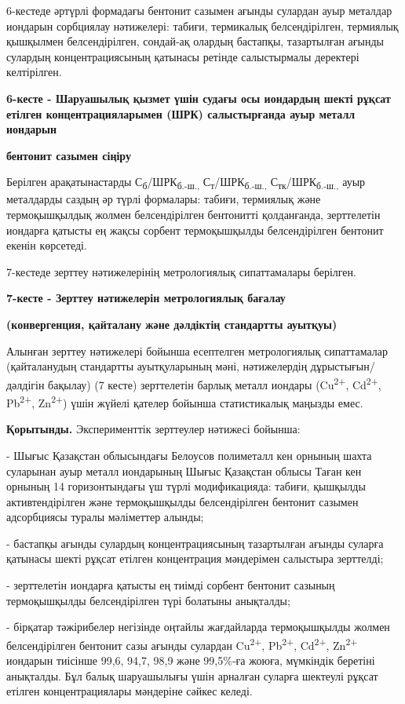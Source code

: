 6-кестеде әртүрлі формадағы бентонит сазымен ағынды сулардан ауыр
металдар иондарын сорбциялау нәтижелері: табиғи, термикалық
белсендірілген, термиялық қышқылмен белсендірілген, сондай-ақ олардың
бастапқы, тазартылған ағынды сулардың концентрациясының қатынасы ретінде
салыстырмалы деректері келтірілген.

{\bfseries 6-кесте - Шаруашылық қызмет үшін судағы осы иондардың шекті
рұқсат етілген концентрацияларымен (ШРК) салыстырғанда ауыр металл
иондарын}

{\bfseries бентонит сазымен сіңіру}


Берілген арақатынастарды С\textsubscript{б}/ШРК\textsubscript{б.-ш.,}
С\textsubscript{т}/ШРК\textsubscript{б.-ш.,}
С\textsubscript{тк}/ШРК\textsubscript{б.-ш.,} ауыр металдарды саздың әр
түрлі формалары: табиғи, термиялық және термоқышқылдық жолмен
белсендірілген бентонитті қолданғанда, зерттелетін иондарға қатысты ең
жақсы сорбент термоқышқылды белсендірілген бентонит екенін көрсетеді.

7-кестеде зерттеу нәтижелерінің метрологиялық сипаттамалары берілген.

{\bfseries 7-кесте - Зерттеу нәтижелерін метрологиялық бағалау}

{\bfseries (конвергенция, қайталану және дәлдіктің стандартты ауытқуы)}


Алынған зерттеу нәтижелері бойынша есептелген метрологиялық сипаттамалар
(қайталанудың стандартты ауытқуларының мәні, нәтижелердің
дұрыстығын/дәлдігін бақылау) (7 кесте) зерттелетін барлық металл иондары
(Cu\textsuperscript{2+}, Cd\textsuperscript{2+}, Pb\textsuperscript{2+},
Zn\textsuperscript{2+}) үшін жүйелі қателер бойынша статистикалық
маңызды емес.

{\bfseries Қорытынды.} Эксперименттік зерттеулер нәтижесі бойынша:

- Шығыс Қазақстан облысындағы Белоусов полиметалл кен орнының шахта
суларынан ауыр металл иондарының Шығыс Қазақстан облысы Таған кен
орнының 14 горизонтындағы үш түрлі модификацияда: табиғи, қышқылды
активтендірілген және термоқышқылды белсендірілген бентонит сазымен
адсорбциясы туралы мәліметтер алынды;

- бастапқы ағынды сулардың концентрациясының тазартылған ағынды суларға
қатынасы шекті рұқсат етілген концентрация мәндерімен салыстыра
зерттелді;

- зерттелетін иондарға қатысты ең тиімді сорбент бентонит сазының
термоқышқылды белсендірілген түрі болатыны анықталды;

- бірқатар тәжірибелер негізінде оңтайлы жағдайларда термоқышқылды
жолмен белсендірілген бентонит сазы ағынды сулардан
Cu\textsuperscript{2+}, Pb\textsuperscript{2+}, Cd\textsuperscript{2+},
Zn\textsuperscript{2+} иондарын тиісінше 99,6, 94,7, 98,9 және 99,5\%-ға
жоюға, мүмкіндік беретіні анықталды. Бұл балық шаруашылығы үшін арналған
суларға шектеулі рұқсат етілген концентрациялары мәндеріне сәйкес
келеді.

